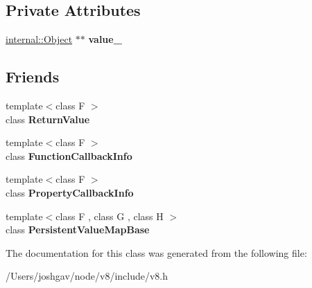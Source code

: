 \subsection*{Private Attributes}
\begin{DoxyCompactItemize}
\item 
\hyperlink{classv8_1_1internal_1_1_object}{internal\+::\+Object} $\ast$$\ast$ {\bfseries value\+\_\+}\hypertarget{classv8_1_1_return_value_abb24c21d81cd11d48a5f3872529702a7}{}\label{classv8_1_1_return_value_abb24c21d81cd11d48a5f3872529702a7}

\end{DoxyCompactItemize}
\subsection*{Friends}
\begin{DoxyCompactItemize}
\item 
{\footnotesize template$<$class F $>$ }\\class {\bfseries Return\+Value}\hypertarget{classv8_1_1_return_value_a53f604d3d6f2dc0647df33c9979f116a}{}\label{classv8_1_1_return_value_a53f604d3d6f2dc0647df33c9979f116a}

\item 
{\footnotesize template$<$class F $>$ }\\class {\bfseries Function\+Callback\+Info}\hypertarget{classv8_1_1_return_value_a76786e6fa2d0eac5e2d4f647659d0d23}{}\label{classv8_1_1_return_value_a76786e6fa2d0eac5e2d4f647659d0d23}

\item 
{\footnotesize template$<$class F $>$ }\\class {\bfseries Property\+Callback\+Info}\hypertarget{classv8_1_1_return_value_a5018adab21fade2b42f4f60e45fa1083}{}\label{classv8_1_1_return_value_a5018adab21fade2b42f4f60e45fa1083}

\item 
{\footnotesize template$<$class F , class G , class H $>$ }\\class {\bfseries Persistent\+Value\+Map\+Base}\hypertarget{classv8_1_1_return_value_a08e2b8f164392d71811ce6cc134f33e3}{}\label{classv8_1_1_return_value_a08e2b8f164392d71811ce6cc134f33e3}

\end{DoxyCompactItemize}


The documentation for this class was generated from the following file\+:\begin{DoxyCompactItemize}
\item 
/\+Users/joshgav/node/v8/include/v8.\+h\end{DoxyCompactItemize}
